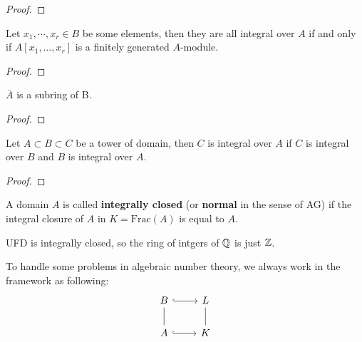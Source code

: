 \begin{proof}
    
\end{proof}

\begin{corollary}
    Let \(x_1 ,\cdots , x_r  \in B\) be some elements, then they are all integral over \(A\) if and only if \(A[x_1,\dots,x_r]\) is a finitely generated \(A\)-module.
\end{corollary}

\begin{proof}
    
\end{proof}

\begin{corollary}
    \(\bar{A} \) is a subring of B.
\end{corollary}

\begin{proof}
    
\end{proof}

\begin{corollary}
    Let \(A \subset B \subset C\) be a tower of domain, then \(C\) is integral over \(A\) if  \(C\) is integral over \(B\) and \(B\) is integral over \(A\).
\end{corollary}

\begin{proof}
    
\end{proof}

\begin{definition}
    A domain \(A\) is called \textbf{integrally closed} (or \textbf{normal} in the sense of AG) if the integral closure of \(A\) in \(K = \mathrm{Frac}(A)\) is equal to \(A\).
\end{definition}

\begin{remark}
    UFD is integrally closed, so the ring of intgers of \(\mathbb{Q}\) is just \(\mathbb{Z}\).
\end{remark}

To handle some problems in algebraic number theory, we always work in the framework as following:
\[\begin{tikzcd}
	B & L \\
	A & K
	\arrow[hook, from=1-1, to=1-2]
	\arrow[no head, from=2-1, to=1-1]
	\arrow[hook, from=2-1, to=2-2]
	\arrow[no head, from=2-2, to=1-2]
\end{tikzcd}\]

